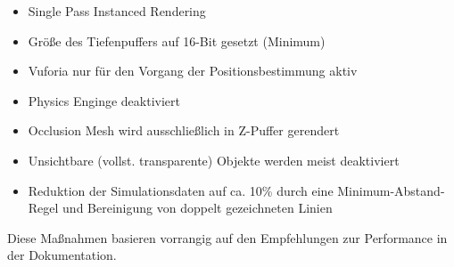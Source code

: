 \begin{itemize}
	\setlength{\itemsep}{-1pt}
	\singlespacing
	\item Single Pass Instanced Rendering
	\item Größe des Tiefenpuffers auf 16-Bit gesetzt (Minimum)
	\item Vuforia nur für den Vorgang der Positionsbestimmung aktiv
	\item Physics Enginge deaktiviert
	\item Occlusion Mesh wird ausschließlich in Z-Puffer gerendert
	\item Unsichtbare (vollst. transparente) Objekte werden meist deaktiviert
	\item Reduktion der Simulationsdaten auf ca. 10\% durch eine Minimum-Abstand-Regel und Bereinigung von doppelt gezeichneten Linien
\end{itemize}

Diese Maßnahmen basieren vorrangig auf den Empfehlungen zur Performance in der Dokumentation.